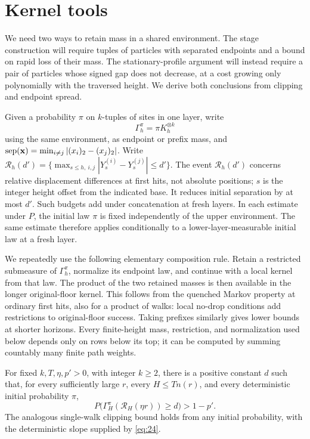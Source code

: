 \section{Kernel tools}\label{sec:kernels}

We need two ways to retain mass in a shared environment. The stage
construction will require tuples of particles with separated endpoints
and a bound on rapid loss of their mass. The stationary-profile argument
will instead require a pair of particles whose signed gap does not
decrease, at a cost growing only polynomially with the traversed height.
We derive both conclusions from clipping and endpoint spread.

Given a probability \(\pi\) on \(k\)-tuples of sites in one layer, write
\[
\Gamma_h^\pi=\pi K_h^{\otimes k}
\]
using the same environment, as endpoint or prefix mass, and \({\rm sep}(\mathbf x)=\min_{i\ne j}|(x_i)_2-(x_j)_2|\). Write
\(\mathcal R_h(d')=\{\max_{s\le h,\ i,j}|Y_s^{(i)}-Y_s^{(j)}|\le d'\}\).
The event \(\mathcal R_h(d')\) concerns relative displacement differences
at first hits, not absolute positions; \(s\) is the integer height offset
from the indicated base. It reduces initial separation by at most \(d'\).
Such budgets add under concatenation at fresh layers. In each estimate
under \(P\), the initial law \(\pi\) is fixed independently of the
upper environment. The same estimate therefore applies conditionally
to a lower-layer-measurable initial law at a fresh layer.

We repeatedly use the following elementary composition rule. Retain a
restricted submeasure of \(\Gamma_h^\pi\), normalize its endpoint law,
and continue with a local kernel from that law. The product of the two
retained masses is then available in the longer original-floor kernel.
This follows from the quenched Markov property at ordinary first hits,
also for a product of walks: local no-drop conditions add restrictions
to original-floor success. Taking prefixes similarly gives lower bounds
at shorter horizons. Every finite-height mass, restriction, and
normalization used below depends only on rows below its top; it can be
computed by summing countably many finite path weights.

\begin{lemma}\label{kernel-initial-clipping}
For fixed \(k,T,\eta,p'>0\), with integer \(k\ge2\), there is a
positive constant \(d\) such that, for every sufficiently large \(r\),
every \(H\le Tn(r)\), and every deterministic initial probability
\(\pi\),
\[
P\big(\Gamma_H^\pi(\mathcal R_H(\eta r))\ge d\big)>1-p'.
\]
The analogous single-walk clipping bound holds from any initial
probability, with the deterministic slope supplied by \eqref{eq:24}.
\end{lemma}

